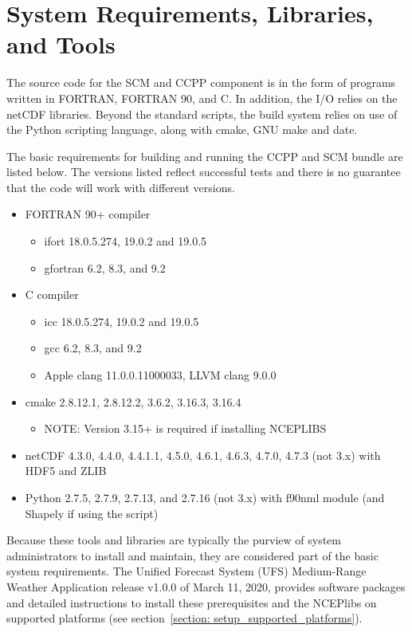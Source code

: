 \section{System Requirements, Libraries, and Tools}
\label{section: systemrequirements}

The source code for the SCM and CCPP component is in the form of programs written in FORTRAN, FORTRAN 90, and C. In addition, the I/O relies on the netCDF libraries. Beyond the standard scripts, the build system relies on use of the Python scripting language, along with cmake, GNU make and date.

The basic requirements for building and running the CCPP and SCM bundle are listed below. The versions listed reflect successful tests and there is no guarantee that the code will work with different versions.
\begin{itemize}
    \item FORTRAN 90+ compiler
    	\begin{itemize}
   	 \item ifort 18.0.5.274, 19.0.2 and 19.0.5
	 \item gfortran 6.2, 8.3, and 9.2
	 \end{itemize}
    \item C compiler
    	\begin{itemize}
	\item icc 18.0.5.274, 19.0.2 and 19.0.5
	\item gcc 6.2, 8.3, and 9.2
	\item Apple clang 11.0.0.11000033, LLVM clang 9.0.0
	\end{itemize}
    \item cmake 2.8.12.1, 2.8.12.2, 3.6.2, 3.16.3, 3.16.4
    	\begin{itemize}
	\item NOTE: Version 3.15+ is required if installing NCEPLIBS
	\end{itemize}
   	 \item netCDF 4.3.0, 4.4.0, 4.4.1.1, 4.5.0, 4.6.1, 4.6.3, 4.7.0, 4.7.3 (not 3.x) with HDF5 and ZLIB
    \item Python 2.7.5, 2.7.9, 2.7.13, and 2.7.16 (not 3.x) with f90nml module (and Shapely if using the  script)
\end{itemize}

Because these tools and libraries are typically the purview of system administrators to install and maintain, they are considered  part of the basic system requirements. The Unified Forecast System (UFS) Medium-Range Weather Application release v1.0.0 of March 11, 2020, provides software packages and detailed instructions to install these prerequisites and the NCEPlibs on supported platforms (see section~\ref{section: setup_supported_platforms}).

